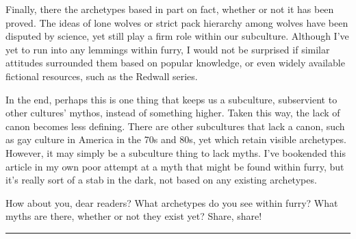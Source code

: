Finally, there the archetypes based in part on fact, whether or not it
has been proved. The ideas of lone wolves or strict pack hierarchy among
wolves have been disputed by science, yet still play a firm role within
our subculture. Although I've yet to run into any lemmings within furry,
I would not be surprised if similar attitudes surrounded them based on
popular knowledge, or even widely available fictional resources, such as
the Redwall series.

In the end, perhaps this is one thing that keeps us a subculture,
subservient to other cultures' mythos, instead of something higher.
Taken this way, the lack of canon becomes less defining. There are other
subcultures that lack a canon, such as gay culture in America in the 70s
and 80s, yet which retain visible archetypes. However, it may simply be
a subculture thing to lack myths. I've bookended this article in my own
poor attempt at a myth that might be found within furry, but it's really
sort of a stab in the dark, not based on any existing archetypes.

How about you, dear readers? What archetypes do you see within furry?
What myths are there, whether or not they exist yet? Share, share!

\begin{center}\rule{0.5\linewidth}{\linethickness}\end{center}

